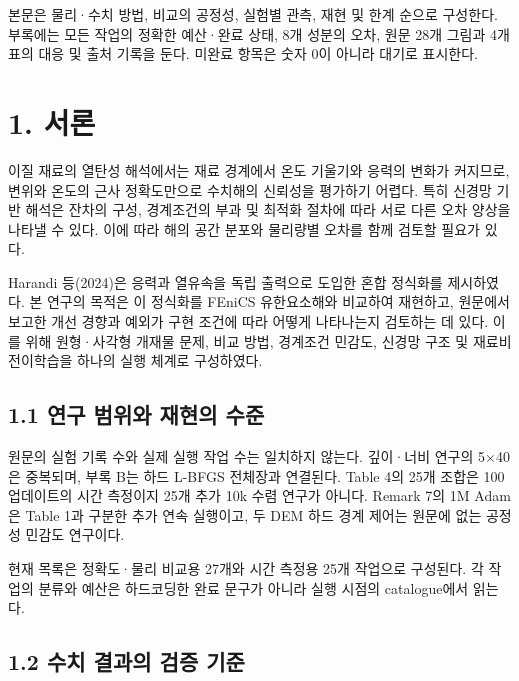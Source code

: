 \documentclass[10pt,a4paper]{article}
\begin{document}
본문은 물리·수치 방법, 비교의 공정성, 실험별 관측, 재현 및 한계 순으로 구성한다. 부록에는 모든 작업의 정확한 예산·완료 상태, 8개 성분의 오차, 원문 28개 그림과 4개 표의 대응 및 출처 기록을 둔다. 미완료 항목은 숫자 0이 아니라 대기로 표시한다.\par

\tableofcontents\thispagestyle{fancy}

\clearpage

\section{1. 서론}

이질 재료의 열탄성 해석에서는 재료 경계에서 온도 기울기와 응력의 변화가 커지므로, 변위와 온도의 근사 정확도만으로 수치해의 신뢰성을 평가하기 어렵다. 특히 신경망 기반 해석은 잔차의 구성, 경계조건의 부과 및 최적화 절차에 따라 서로 다른 오차 양상을 나타낼 수 있다. 이에 따라 해의 공간 분포와 물리량별 오차를 함께 검토할 필요가 있다.\par

Harandi 등(2024)은 응력과 열유속을 독립 출력으로 도입한 혼합 정식화를 제시하였다. 본 연구의 목적은 이 정식화를 FEniCS 유한요소해와 비교하여 재현하고, 원문에서 보고한 개선 경향과 예외가 구현 조건에 따라 어떻게 나타나는지 검토하는 데 있다. 이를 위해 원형·사각형 개재물 문제, 비교 방법, 경계조건 민감도, 신경망 구조 및 재료비 전이학습을 하나의 실행 체계로 구성하였다.\par

\subsection{1.1 연구 범위와 재현의 수준}

원문의 실험 기록 수와 실제 실행 작업 수는 일치하지 않는다. 깊이·너비 연구의 5$\times$40은 중복되며, 부록 B는 하드 L-BFGS 전체장과 연결된다. Table 4의 25개 조합은 100 업데이트의 시간 측정이지 25개 추가 10k 수렴 연구가 아니다. Remark 7의 1M Adam은 Table 1과 구분한 추가 연속 실행이고, 두 DEM 하드 경계 제어는 원문에 없는 공정성 민감도 연구이다.\par

현재 목록은 정확도·물리 비교용 27개와 시간 측정용 25개 작업으로 구성된다. 각 작업의 분류와 예산은 하드코딩한 완료 문구가 아니라 실행 시점의 catalogue에서 읽는다.\par

\subsection{1.2 수치 결과의 검증 기준}
\end{document}
